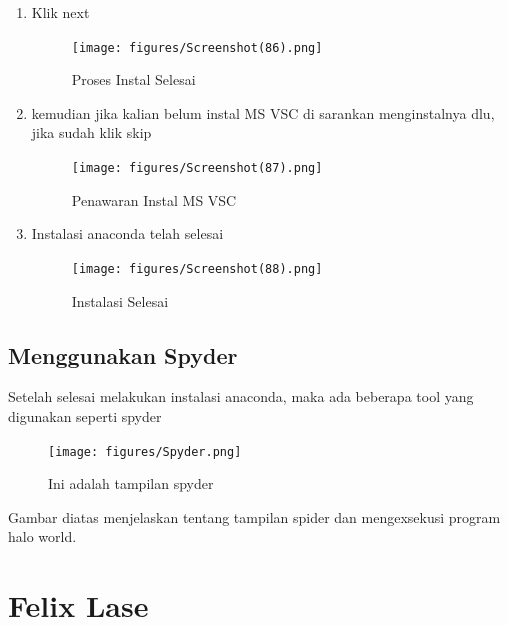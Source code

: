 \begin{enumerate}
    \item Klik next
    \begin{figure}[!Htbp]
        \centering
        \texttt{[image: figures/Screenshot(86).png]}
        \caption{Proses Instal Selesai}
        \label{Proses}
        \end{figure}

    \item kemudian jika kalian belum instal MS VSC di sarankan menginstalnya dlu, jika sudah klik skip
    \begin{figure}[!Htbp]
        \centering
        \texttt{[image: figures/Screenshot(87).png]}
        \caption{Penawaran Instal MS VSC}
        \label{offering}
        \end{figure}

    \item Instalasi anaconda telah selesai
    \begin{figure}[!Htbp]
        \centering
        \texttt{[image: figures/Screenshot(88).png]}
        \caption{Instalasi Selesai}
        \label{akhir}
        \end{figure}
\end{enumerate}
\subsection{Menggunakan Spyder}
Setelah selesai melakukan instalasi anaconda, maka ada beberapa tool yang digunakan seperti spyder

\begin{figure}[!Htbp]
    \centering
    \texttt{[image: figures/Spyder.png]}
    \caption{Ini adalah tampilan spyder}
    \label{spyder}
    \end{figure}

Gambar diatas menjelaskan tentang tampilan spider dan mengexsekusi program halo world.


\section{Felix Lase}
